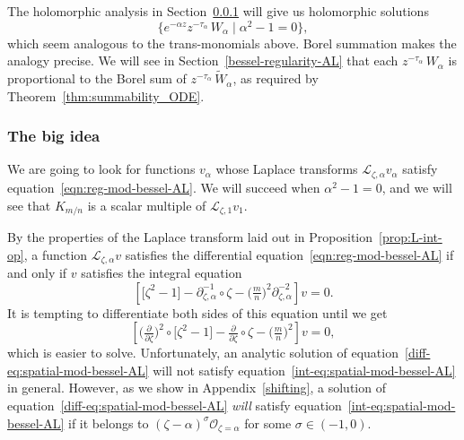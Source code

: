 \documentclass{article}
\newcommand{\series}[1]{\tilde{#1}}
\newcommand{\fracderiv}[3]{\partial^{#1}_{#2, #3}}
\newcommand{\laplace}{\mathcal{L}}
\theoremstyle{definition}
\theoremstyle{plain}
\begin{document}
The holomorphic analysis in Section~\ref{big-idea} will give us holomorphic solutions
\[ \{ e^{-\alpha z} z^{-\tau_\alpha}\,W_\alpha \mid \alpha^2 - 1 = 0 \}, \]
which seem analogous to the trans-monomials above. Borel summation makes the analogy precise. We will see in Section~\ref{bessel-regularity-AL} that each $z^{-\tau_\alpha}\,W_\alpha$ is proportional to the Borel sum of $z^{-\tau_\alpha}\,\series{W}_\alpha$, as required by Theorem~\ref{thm:summability_ODE}.
\subsubsection{The big idea}\label{big-idea}
We are going to look for functions $v_\alpha$ whose Laplace transforms $\laplace_{\zeta, \alpha} v_\alpha$ satisfy equation~\eqref{eqn:reg-mod-bessel-AL}. We will succeed when $\alpha^2 - 1 = 0$, and we will see that $K_{m/n}$ is a scalar multiple of $\laplace_{\zeta, 1} v_1$.

By the properties of the Laplace transform laid out in Proposition~\ref{prop:L-int-op}, a function $\laplace_{\zeta, \alpha} v$ satisfies the differential equation~\eqref{eqn:reg-mod-bessel-AL} if and only if $v$ satisfies the integral equation
\begin{equation}\label{int-eq:spatial-mod-bessel-AL}
\left[ \big[ \zeta^2 - 1 \big] - \fracderiv{-1}{\zeta}{\alpha} \circ \zeta - \big(\tfrac{m}{n}\big)^2 \fracderiv{-2}{\zeta}{\alpha} \right] v = 0.
\end{equation}
It is tempting to differentiate both sides of this equation until we get
\begin{equation}\label{diff-eq:spatial-mod-bessel-AL}
\left[ \big(\tfrac{\partial}{\partial \zeta}\big)^2 \circ \big[ \zeta^2 - 1 \big] - \tfrac{\partial}{\partial \zeta} \circ \zeta - \big(\tfrac{m}{n}\big)^2 \right] v = 0,
\end{equation}
which is easier to solve. Unfortunately, an analytic solution of equation~\eqref{diff-eq:spatial-mod-bessel-AL} will not satisfy equation~\eqref{int-eq:spatial-mod-bessel-AL} in general. However, as we show in Appendix~\ref{shifting}, a solution of equation~\eqref{diff-eq:spatial-mod-bessel-AL} {\em will} satisfy equation~\eqref{int-eq:spatial-mod-bessel-AL} if it belongs to $(\zeta - \alpha)^\sigma \mathcal{O}_{\zeta = \alpha}$ for some $\sigma \in (-1, 0)$.
\end{document}
